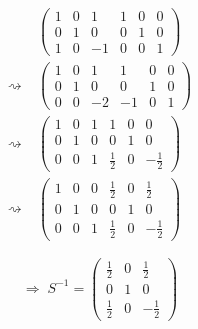 \documentclass[a4paper,12pt]{article}
\begin{document}
\begin{enumerate}[label=\alph*)]
    \begin{align*}
        &\left(\begin{array}{ccc|ccc}
            1 & 0 & 1 & 1 & 0 & 0 \\
            0 & 1 & 0 & 0 & 1 & 0 \\
            1 & 0 & -1 & 0 & 0 & 1
          \end{array}\right) \\
        \rightsquigarrow\;&\left(\begin{array}{ccc|ccc}
            1 & 0 & 1 & 1 & 0 & 0 \\
            0 & 1 & 0 & 0 & 1 & 0 \\
            0 & 0 & -2 & -1 & 0 & 1
          \end{array}\right) \\
        \rightsquigarrow\;&\left(\begin{array}{ccc|ccc}
            1 & 0 & 1 & 1 & 0 & 0 \\
            0 & 1 & 0 & 0 & 1 & 0 \\
            0 & 0 & 1 & \tfrac{1}{2} & 0 & -\tfrac{1}{2}
          \end{array}\right) \\
        \rightsquigarrow\;&\left(\begin{array}{ccc|ccc}
            1 & 0 & 0 & \tfrac{1}{2} & 0 & \tfrac{1}{2} \\
            0 & 1 & 0 & 0 & 1 & 0 \\
            0 & 0 & 1 & \tfrac{1}{2} & 0 & -\tfrac{1}{2}
          \end{array}\right)
    \end{align*}

    \[
        \Rightarrow\; S^{-1} = \begin{pmatrix}
            \tfrac{1}{2} & 0 & \tfrac{1}{2} \\
            0 & 1 & 0 \\
            \tfrac{1}{2} & 0 & -\tfrac{1}{2}
          \end{pmatrix}
    \]


\end{enumerate}
\end{document}
